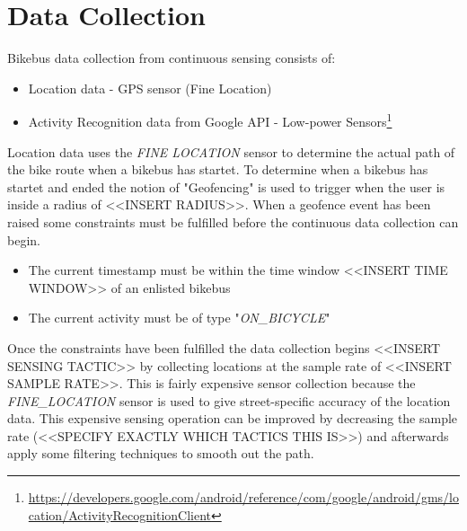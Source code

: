 

\section{Data Collection}

Bikebus data collection from continuous sensing consists of: 
\begin{itemize}
    \item Location data - GPS sensor (Fine Location)
    \item Activity Recognition data from Google API - Low-power Sensors\footnote{\url{https://developers.google.com/android/reference/com/google/android/gms/location/ActivityRecognitionClient}}
\end{itemize}

Location data uses the \textit{FINE LOCATION} sensor to determine the actual path of the bike route when a bikebus has startet. To determine when a bikebus has startet and ended the notion of "Geofencing" is used to trigger when the user is inside a radius of <<INSERT RADIUS>>. 
When a geofence event has been raised some constraints must be fulfilled before the continuous data collection can begin.
\begin{itemize}
    \item The current timestamp must be within the time window <<INSERT TIME WINDOW>> of an enlisted bikebus
    \item The current activity must be of type "\textit{ON\_BICYCLE}"
\end{itemize}
Once the constraints have been fulfilled the data collection begins <<INSERT SENSING TACTIC>> by collecting locations at the sample rate of <<INSERT SAMPLE RATE>>. This is fairly expensive sensor collection because the \textit{FINE\_LOCATION} sensor is used to give street-specific accuracy of the location data. This expensive sensing operation can be improved by decreasing the sample rate (<<SPECIFY EXACTLY WHICH TACTICS THIS IS>>) and afterwards apply some filtering techniques to smooth out the path.

